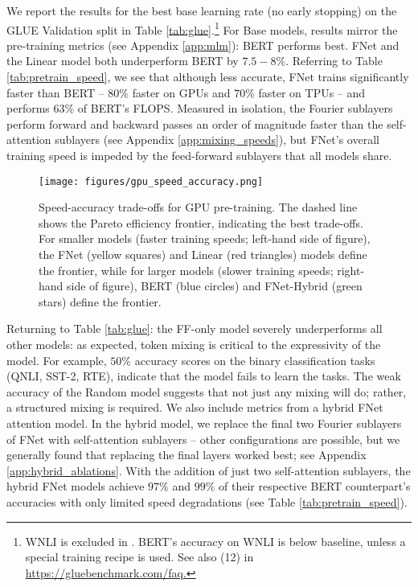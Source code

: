 \documentclass[11pt]{article}
\begin{document}
We report the results for the best base learning rate (no early stopping) on the GLUE Validation split in Table \ref{tab:glue}.\footnote{WNLI is excluded in \citet{devlin2018bert}. BERT’s accuracy on WNLI is below baseline, unless a special training recipe is used. See also (12) in \url{https://gluebenchmark.com/faq.}}
For Base models, results mirror the pre-training metrics (see Appendix \ref{app:mlm}): BERT performs best. FNet and the Linear model both  underperform BERT by $7.5-8\%$. Referring to Table \ref{tab:pretrain_speed}, we see that although less accurate, FNet trains significantly faster than BERT -- $80\%$ faster on GPUs and $70\%$ faster on TPUs -- and performs $63\%$ of BERT's FLOPS. Measured in isolation, the Fourier sublayers perform forward and backward passes an order of magnitude faster than the self-attention sublayers (see Appendix \ref{app:mixing_speeds}), but FNet's overall training speed is impeded by the feed-forward sublayers that all models share.

\begin{figure*}[tb]
    \centering
    \texttt{[image: figures/gpu\_speed\_accuracy.png]}
    \caption{
    Speed-accuracy trade-offs for GPU pre-training. The dashed line shows the Pareto efficiency frontier, indicating the best trade-offs. For smaller models (faster training speeds; left-hand side of figure), the FNet (yellow squares) and Linear (red triangles) models define the frontier, while for larger models (slower training speeds; right-hand side of figure), BERT (blue circles) and FNet-Hybrid (green stars) define the frontier.}
    \label{fig:gpu_speed_accuracy}
\end{figure*}

Returning to Table \ref{tab:glue}: the FF-only model severely underperforms all other models: as expected, token mixing is critical to the expressivity of the model. For example, $50\%$ accuracy scores on the binary classification tasks (QNLI, SST-2, RTE), indicate that the model fails to learn the tasks. The weak accuracy of the Random model suggests that not just any mixing will do; rather, a structured mixing is required. We also include metrics from a hybrid FNet attention model. In the hybrid model, we replace the final two Fourier sublayers of FNet with self-attention sublayers -- other configurations are possible, but we generally found that replacing the final layers worked best; see Appendix \ref{app:hybrid_ablations}. With the addition of just two self-attention sublayers, the hybrid FNet models achieve $97\%$ and $99\%$ of their respective BERT counterpart's accuracies with only limited speed degradations (see Table \ref{tab:pretrain_speed}).
\end{document}
